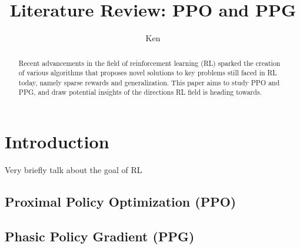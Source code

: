 \documentclass[12pt]{article} %
\title{Literature Review: PPO and PPG}
\author{Ken}
\begin{document}
\maketitle
\begin{abstract}
Recent advancements in the field of reinforcement learning (RL) sparked the creation of various algorithms that proposes novel solutions to key problems still faced in RL today, namely sparse rewards and generalization. This paper aims to study PPO and PPG, and draw potential insights of the directions RL field is heading towards. 
\end{abstract}

\section{Introduction}
Very briefly talk about the goal of RL
\subsection{Proximal Policy Optimization (PPO)}
\subsection{Phasic Policy Gradient (PPG)}
\end{document}
